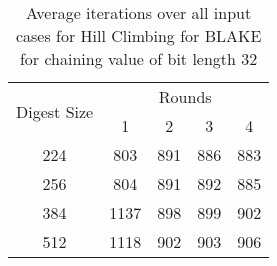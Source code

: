 \begin{table}
  \begin{center}
    \begin{tabular}{ | c | c | c | c | c | } \hline
     \multirow{2}{*}{Digest Size} & \multicolumn{4}{c|}{Rounds} \\ \cline{2-5}
                                  & 1    & 2   & 3   & 4   \\ \hline
     224                          & 803  & 891 & 886 & 883 \\ \hline
     256                          & 804  & 891 & 892 & 885 \\ \hline
     384                          & 1137 & 898 & 899 & 902 \\ \hline
     512                          & 1118 & 902 & 903 & 906 \\ \hline
    \end{tabular}
    \caption{Average iterations over all input cases for Hill Climbing for BLAKE for chaining value
    of bit length 32}
  \end{center}
\end{table}

